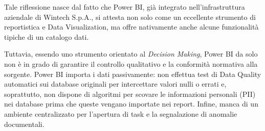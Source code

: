 Tale riflessione nasce dal fatto che Power BI, già integrato nell'infrastruttura aziendale di Wintech S.p.A., si attesta non solo come un eccellente strumento di 
reportistica e Data Visualization, ma offre nativamente anche alcune funzionalità tipiche di un catalogo dati.

Tuttavia, essendo uno strumento orientato al \emph{Decision Making}, Power BI da solo non è in grado di garantire il controllo qualitativo e la 
conformità normativa alla sorgente. Power BI importa i dati passivamente: non effettua test di Data Quality automatici sui database originali per intercettare 
valori nulli o errati e, soprattutto, non dispone di algoritmi per scovare le informazioni personali (PII) nei database prima che queste vengano 
importate nei report. Infine, manca di un ambiente centralizzato per l'apertura di task e la segnalazione di anomalie documentali.


